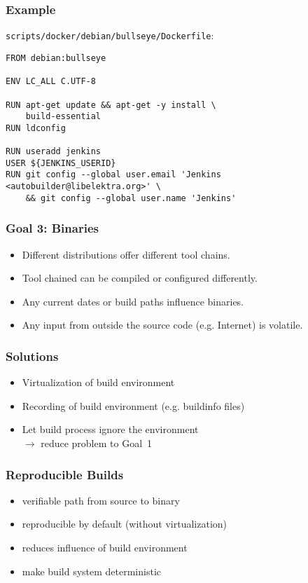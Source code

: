 \begin{frame}[fragile]
	\frametitle{Example}

	\verb+scripts/docker/debian/bullseye/Dockerfile+:

	\begin{lstlisting}[language=docker]
FROM debian:bullseye

ENV LC_ALL C.UTF-8

RUN apt-get update && apt-get -y install \
    build-essential
RUN ldconfig

RUN useradd jenkins
USER ${JENKINS_USERID}
RUN git config --global user.email 'Jenkins <autobuilder@libelektra.org>' \
    && git config --global user.name 'Jenkins' \end{lstlisting}
\end{frame}

\begin{frame}
	\frametitle{Goal 3: Binaries}

	\begin{problem}
	\begin{itemize}[<+-| alert@+>]

	\item Different distributions offer different tool chains.
	\item Tool chained can be compiled or configured differently.
	\item Any current dates or build paths influence binaries.
	\item Any input from outside the source code (e.g. Internet) is volatile.
	\end{itemize}
	\end{problem}
\end{frame}

\begin{frame}
	\frametitle{Solutions}

	\begin{itemize}[<+-| alert@+>]

	\item Virtualization of build environment
	\item Recording of build environment (e.g. buildinfo files)
	\item Let build process ignore the environment \\
		$\rightarrow$ reduce problem to Goal~1
	\end{itemize}
\end{frame}

\begin{frame}
	\frametitle{Reproducible Builds}

	\begin{itemize}[<+-| alert@+>]

	\item verifiable path from source to binary
	\item reproducible by default (without virtualization)
	\item reduces influence of build environment
	\item make build system deterministic
	\end{itemize}
\end{frame}

